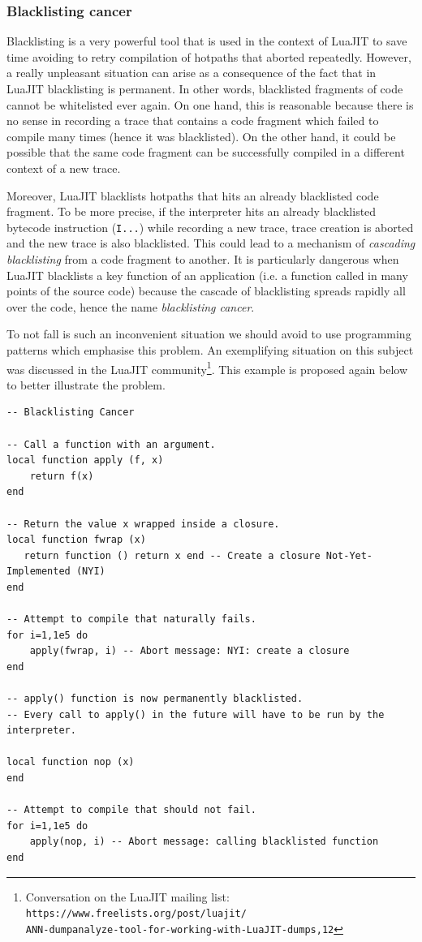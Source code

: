 
\subsubsection{Blacklisting cancer}
Blacklisting is a very powerful tool that is used in the context of LuaJIT to save time avoiding to retry compilation of hotpaths that aborted repeatedly.  However, a really unpleasant situation can arise as a consequence of the fact that in LuaJIT blacklisting is permanent. In other words, blacklisted fragments of code cannot be whitelisted ever again. On one hand, this is reasonable because there is no sense in recording a trace that contains a code fragment which failed to compile many times (hence it was blacklisted). On the other hand, it could be possible that the same code fragment can be successfully compiled in a different context of a new trace.

Moreover, LuaJIT blacklists hotpaths that hits an already blacklisted code fragment. To be more precise, if the interpreter hits an already blacklisted bytecode instruction (\texttt{I...}) while recording a new trace, trace creation is aborted and the new trace is also blacklisted. This could lead to a mechanism of \textit{cascading blacklisting} from a code fragment to another. It is particularly dangerous when LuaJIT blacklists a key function of an application (i.e. a function called in many points of the source code) because the cascade of blacklisting spreads rapidly all over the code, hence the name \textit{blacklisting cancer}. 

To not fall is such an inconvenient situation we should avoid to use programming patterns which emphasise this problem. An exemplifying situation on this subject was discussed in the LuaJIT community\footnote{Conversation on the LuaJIT mailing list: 
\texttt{https://www.freelists.org/post/luajit/\\ANN-dumpanalyze-tool-for-working-with-LuaJIT-dumps,12}}. This example is proposed again below to better illustrate the problem.

\newpage

\begin{lstlisting}[style=LuaStyle]
-- Blacklisting Cancer 

-- Call a function with an argument.
local function apply (f, x) 
	return f(x)
end

-- Return the value x wrapped inside a closure.
local function fwrap (x)
   return function () return x end -- Create a closure Not-Yet-Implemented (NYI)
end

-- Attempt to compile that naturally fails. 
for i=1,1e5 do 
	apply(fwrap, i) -- Abort message: NYI: create a closure
end

-- apply() function is now permanently blacklisted.
-- Every call to apply() in the future will have to be run by the interpreter.

local function nop (x) 
end

-- Attempt to compile that should not fail.
for i=1,1e5 do
	apply(nop, i) -- Abort message: calling blacklisted function
end
\end{lstlisting}

